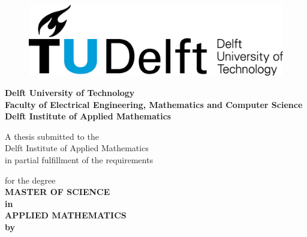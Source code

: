\thispagestyle{empty}
\begin{figure}[h]
  \hfill
  \begin{minipage}[t]{1\linewidth}
       \includegraphics[scale=0.23]{logo_tudelft.png}
    \end{minipage}
  \hfill
\end{figure}
\begin{center}
\vspace{1.0cm}
\large
\textsf{\textbf{\large{Delft University of Technology}} \\
\textbf{\large{Faculty of Electrical Engineering, Mathematics and Computer Science}} \\
\textbf{\large{Delft Institute of Applied Mathematics}}}


\vspace{1.0cm}


\vspace{1.0cm}
\textsf{
\large A thesis submitted to the\\
Delft Institute of Applied Mathematics\\
in partial fulfillment of the requirements}

\vspace{1.0cm}

\textsf{for the degree}\\

\vspace{1.0cm}
\textsf{
\textbf{\large{MASTER OF SCIENCE} \\
in \\
\large{APPLIED MATHEMATICS} \\
\vspace{0.7cm}
by}}


\end{center}
